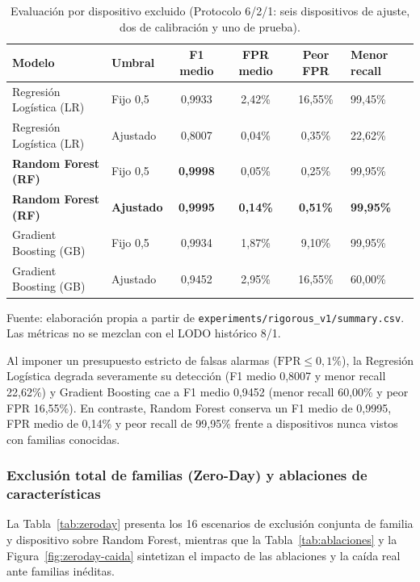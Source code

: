 \documentclass[11pt,a4paper]{article}
\begin{document}
\begin{table}[H]
\centering\small
\caption{Evaluación por dispositivo excluido (Protocolo 6/2/1: seis dispositivos de ajuste, dos de calibración y uno de prueba).}
\label{tab:resultados-621}
\begin{tabularx}{\textwidth}{l l c c c X}
\toprule
\textbf{Modelo} & \textbf{Umbral} & \textbf{F1 medio} & \textbf{FPR medio} & \textbf{Peor FPR} & \textbf{Menor recall} \\
\midrule
Regresión Logística (LR) & Fijo 0,5 & 0,9933 & 2,42\% & 16,55\% & 99,45\% \\
Regresión Logística (LR) & Ajustado & 0,8007 & 0,04\% & 0,35\% & 22,62\% \\
\textbf{Random Forest (RF)} & Fijo 0,5 & \textbf{0,9998} & 0,05\% & 0,25\% & 99,95\% \\
\textbf{Random Forest (RF)} & \textbf{Ajustado} & \textbf{0,9995} & \textbf{0,14\%} & \textbf{0,51\%} & \textbf{99,95\%} \\
Gradient Boosting (GB) & Fijo 0,5 & 0,9934 & 1,87\% & 9,10\% & 99,95\% \\
Gradient Boosting (GB) & Ajustado & 0,9452 & 2,95\% & 16,55\% & 60,00\% \\
\bottomrule
\end{tabularx}
\end{table}
{\footnotesize Fuente: elaboración propia a partir de \texttt{experiments/rigorous\_v1/summary.csv}. Las métricas no se mezclan con el LODO histórico 8/1.}

Al imponer un presupuesto estricto de falsas alarmas ($\text{FPR} \le 0{,}1\%$), la Regresión Logística degrada severamente su detección (F1 medio 0,8007 y menor recall 22,62\%) y Gradient Boosting cae a F1 medio 0,9452 (menor recall 60,00\% y peor FPR 16,55\%). En contraste, Random Forest conserva un F1 medio de 0,9995, FPR medio de 0,14\% y peor recall de 99,95\% frente a dispositivos nunca vistos con familias conocidas.

\subsubsection{Exclusión total de familias (Zero-Day) y ablaciones de características}
La Tabla~\ref{tab:zeroday} presenta los 16 escenarios de exclusión conjunta de familia y dispositivo sobre Random Forest, mientras que la Tabla~\ref{tab:ablaciones} y la Figura~\ref{fig:zeroday-caida} sintetizan el impacto de las ablaciones y la caída real ante familias inéditas.
\end{document}

